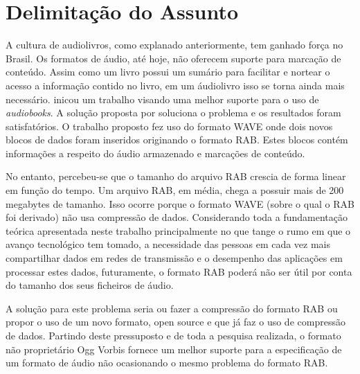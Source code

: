 \chapter[Delimitação do Assunto]{Delimitação do Assunto}\label{cap3}

A cultura de audiolivros, como explanado anteriormente, tem ganhado força no Brasil. Os formatos de áudio, até hoje, não oferecem suporte para marcação de conteúdo. Assim como um livro possui um sumário para facilitar e nortear o acesso a informação contido no livro, em um áudiolivro isso se torna ainda mais necessário. \cite{herbert} inicou um trabalho visando uma melhor suporte para o uso de \textit{audiobooks}. A solução proposta por \cite{herbert} soluciona o problema e os resultados foram satisfatórios. O trabalho proposto fez uso do formato WAVE onde dois novos blocos de dados foram inseridos originando o formato RAB. Estes blocos contém informações a respeito do áudio armazenado e marcações de conteúdo. 

No entanto, percebeu-se que o tamanho do arquivo RAB crescia de forma linear em função do tempo. Um arquivo RAB, em média, chega a possuir mais de 200 megabytes de tamanho. Isso ocorre porque o formato WAVE (sobre o qual o RAB foi derivado) não usa compressão de dados. Considerando toda a fundamentação teórica apresentada neste trabalho principalmente no que tange o rumo em que o avanço tecnológico tem tomado, a necessidade das pessoas em cada vez mais compartilhar dados em redes de transmissão e o desempenho das aplicações em processar estes dados, futuramente, o formato RAB poderá não ser útil por conta do tamanho dos seus 
ficheiros de áudio.

A solução para este problema seria ou fazer a compressão do formato RAB ou propor o uso de um novo formato, open source e que já faz o uso de compressão de dados. Partindo deste pressuposto e de toda a pesquisa realizada, o formato não proprietário Ogg Vorbis fornece um melhor suporte para a especificação de um formato de áudio não ocasionando o mesmo problema do formato RAB.

